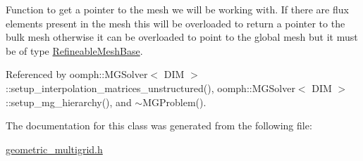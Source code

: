 Function to get a pointer to the mesh we will be working with. If there are flux elements present in the mesh this will be overloaded to return a pointer to the bulk mesh otherwise it can be overloaded to point to the global mesh but it must be of type \hyperlink{classoomph_1_1RefineableMeshBase}{Refineable\+Mesh\+Base}. 



Referenced by oomph\+::\+M\+G\+Solver$<$ D\+I\+M $>$\+::setup\+\_\+interpolation\+\_\+matrices\+\_\+unstructured(), oomph\+::\+M\+G\+Solver$<$ D\+I\+M $>$\+::setup\+\_\+mg\+\_\+hierarchy(), and $\sim$\+M\+G\+Problem().



The documentation for this class was generated from the following file\+:\begin{DoxyCompactItemize}
\item 
\hyperlink{geometric__multigrid_8h}{geometric\+\_\+multigrid.\+h}\end{DoxyCompactItemize}
